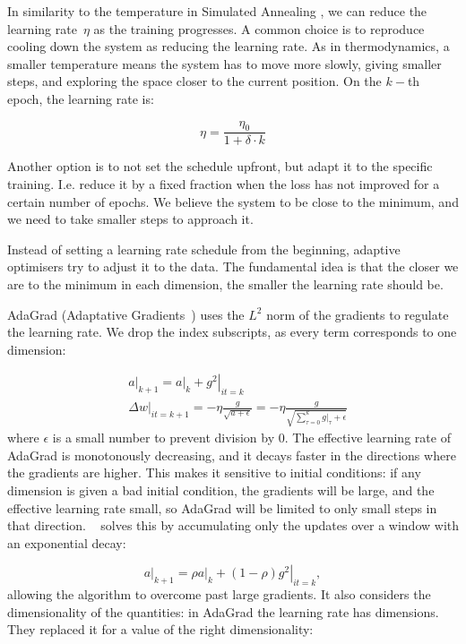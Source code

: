 In similarity 
to the temperature in Simulated Annealing \citep{genSA}, we can reduce the learning rate~$\eta$ as the training progresses.
A common choice is to reproduce cooling down the system as reducing the learning rate.
As in thermodynamics, a smaller temperature means the system has to move more slowly, giving smaller steps, and exploring the space closer to the current position.
On the $k-$th epoch, the learning rate is:

\begin{equation}
\eta= \frac{\eta_0}{1 + \delta \cdot k}
\end{equation}

Another option is to not set the schedule upfront, but adapt it to the specific training.
I.e. reduce it by a fixed fraction when the loss has not improved for a certain number of epochs.
We believe the system to be close to the minimum, and we need to take smaller steps to approach it.

Instead of setting a learning rate schedule from the beginning, adaptive optimisers try to adjust it to the data.
The fundamental idea is that the closer we are to the minimum in each dimension, the smaller the learning rate should be.

AdaGrad (Adaptative Gradients~\citep{adagrad}) uses the $L^2$ norm of the gradients to regulate the learning rate.
We drop the index subscripts, as every term corresponds to one dimension:

\begin{align*}
&\left.a\right|_{k+1} = \left. a\right|_{k} + \left.g^2\right|_{it=k}\\
&\left.\Delta w\right|_{it=k+1} = - \eta\frac{g}{\sqrt{a + \epsilon}} =  - \eta\frac{g}{\sqrt{\sum_{\tau=0}^{k} \left.g\right|_\tau + \epsilon}}
\end{align*}
where $\epsilon$ is a small number to prevent division by 0.
The effective learning rate of AdaGrad is monotonously decreasing, and it decays faster in the directions where the gradients are higher.
This makes it sensitive to initial conditions: if any dimension is given a bad initial condition, the gradients will be large, and the effective learning rate small, so AdaGrad will be limited to only small steps in that direction.
\ADADELTA~\citep{adadelta} solves this by accumulating only the updates over a window with an exponential decay:

\begin{equation*}
\left.a\right|_{k+1} = \rho \left. a\right|_{k} + (1-\rho) \left.g^2\right|_{it=k},
\end{equation*}
allowing the algorithm to overcome past large gradients.
It also considers the dimensionality of the quantities: in AdaGrad the learning rate has dimensions.
They replaced it for a value of the right dimensionality:

